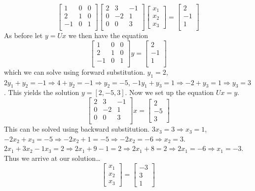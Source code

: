\documentclass[10pt]{jhwhw}
\begin{document}
	$$
	\begin{bmatrix}
		1 & 0 & 0 \\
		2 & 1 & 0 \\
		-1 & 0 & 1 \\
	\end{bmatrix}
	\begin{bmatrix}
		2 & 3 & -1 \\
		0 & -2 & 1 \\
		0 & 0 & 3 \\
	\end{bmatrix}
	\begin{bmatrix}
		x_1 \\ x_2 \\ x_3
	\end{bmatrix} = 
	\begin{bmatrix}
		2 \\ -1 \\ 1 \\
	\end{bmatrix}
	$$
	\bigbreak
	As before let $y=Ux$ we then have the equation
	$$
	\begin{bmatrix}
		1 & 0 & 0 \\
		2 & 1 & 0 \\
		-1 & 0 & 1 \\
	\end{bmatrix}y = 
	\begin{bmatrix}
		2 \\ -1 \\ 1 \\
	\end{bmatrix}
	$$
	which we can solve using forward substitution. $y_1 = 2$, $2y_1 + y_2 = -1 \Rightarrow
	4 + y_2 = -1 \Rightarrow y_2 = -5$, $-1y_1 + y_3 = 1 \Rightarrow -2 + y_3 = 1 \Rightarrow
	y_3 = 3$. This yields the solution $y = [2, -5, 3]$. Now we set up the equation $Ux = y$.
	$$
	\begin{bmatrix}
		2 & 3 & -1 \\
		0 & -2 & 1 \\
		0 & 0 & 3 \\
	\end{bmatrix}x = 
	\begin{bmatrix}
		2 \\ -5 \\ 3
	\end{bmatrix}
	$$
	This can be solved using backward substitution. $3x_3 = 3 \Rightarrow x_3 = 1$,
	$-2x_2 + x_3 = -5 \Rightarrow -2x_2 + 1 = -5 \Rightarrow -2x_2 = -6 \Rightarrow x_2 = 3$.
	$2x_1 + 3x_2 -1x_3 = 2 \Rightarrow 2x_1 + 9 - 1 = 2 \Rightarrow 2x_1 + 8 = 2 \Rightarrow
	2x_1 = -6 \Rightarrow x_1 = -3$.
	Thus we arrive at our solution\ldots
	$$
	\begin{bmatrix}
		x_1 \\ x_2 \\ x_3
	\end{bmatrix} = 
	\begin{bmatrix}
		-3 \\ 3 \\ 1
	\end{bmatrix}
	$$
\end{document}

